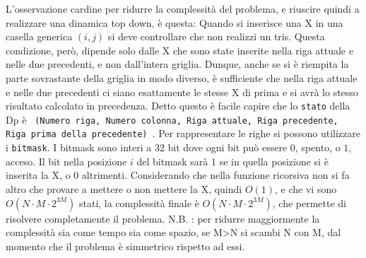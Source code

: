 L'osservazione cardine per ridurre la complessità del problema, e riuscire quindi a realizzare una dinamica top down, è questa:\newline
Quando si inserisce una X in una casella generica $(i, j)$ si deve controllare che non realizzi un tris. Questa condizione, però, dipende solo dalle X che sono state inserite nella riga attuale e nelle due precedenti, e non dall'intera griglia. Dunque, anche se si è riempita la parte sovrastante della griglia in modo diverso, è sufficiente che nella riga attuale e nelle due precedenti ci siano esattamente le stesse X di prima e si avrà lo stesso risultato calcolato in precedenza.
Detto questo è facile capire che lo \texttt{stato} della Dp è \texttt{ (Numero riga, Numero colonna, Riga attuale, Riga precedente, Riga prima della precedente) }.
Per rappresentare le righe si possono utilizzare i \texttt{bitmask}. I bitmask sono interi a 32 bit dove ogni bit può essere $0$, spento, o $1$, acceso. Il bit nella posizione $i$ del bitmask sarà $1$ se in quella posizione si è inserita la X, o $0$ altrimenti. 
Considerando che nella funzione ricorsiva non si fa altro che provare a mettere o non mettere la X, quindi $O(1)$, e che vi sono $O(N \cdot M \cdot 2^{3M} )$ stati, la complessità finale è $O(N \cdot M \cdot 2^{3M} )$, che permette di risolvere completamente il problema.\newline
N.B. : per ridurre maggiormente la complessità sia come tempo sia  come spazio, se M>N si scambi N con M, dal momento che il problema è simmetrico rispetto ad essi.\newline

\CodiceDP
\colorbox{white}{}